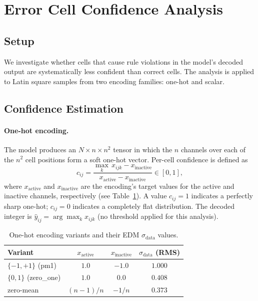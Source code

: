 \section{Error Cell Confidence Analysis}

\subsection{Setup}

We investigate whether cells that cause rule violations in the model's decoded output
are systematically less confident than correct cells.
The analysis is applied to Latin square samples from two encoding families:
one-hot and scalar.

\subsection{Confidence Estimation}

\paragraph{One-hot encoding.}
The model produces an $N \times n \times n^2$ tensor in which the $n$ channels over
each of the $n^2$ cell positions form a soft one-hot vector.
Per-cell confidence is defined as
\begin{equation}
  c_{ij} = \frac{\max_k \, x_{ijk} - x_{\text{inactive}}}{x_{\text{active}} - x_{\text{inactive}}} \in [0,1],
  \label{eq:onehot_conf}
\end{equation}
where $x_{\text{active}}$ and $x_{\text{inactive}}$ are the encoding's target values
for the active and inactive channels, respectively (see Table~\ref{tab:encodings}).
A value $c_{ij}=1$ indicates a perfectly sharp one-hot; $c_{ij}=0$ indicates a
completely flat distribution.
The decoded integer is $\hat{y}_{ij} = \arg\max_k x_{ijk}$ (no threshold applied
for this analysis).

\begin{table}[h]
\centering
\small
\begin{tabular}{lccc}
\toprule
Variant & $x_{\text{active}}$ & $x_{\text{inactive}}$ & $\sigma_{\text{data}}$ (RMS) \\
\midrule
$\{-1,+1\}$ (pm1) & $1.0$ & $-1.0$ & $1.000$ \\
$\{0,1\}$ (zero\_one) & $1.0$ & $0.0$ & $0.408$ \\
zero-mean & $(n-1)/n$ & $-1/n$ & $0.373$ \\
\bottomrule
\end{tabular}
\caption{One-hot encoding variants and their EDM $\sigma_{\text{data}}$ values.}
\label{tab:encodings}
\end{table}

